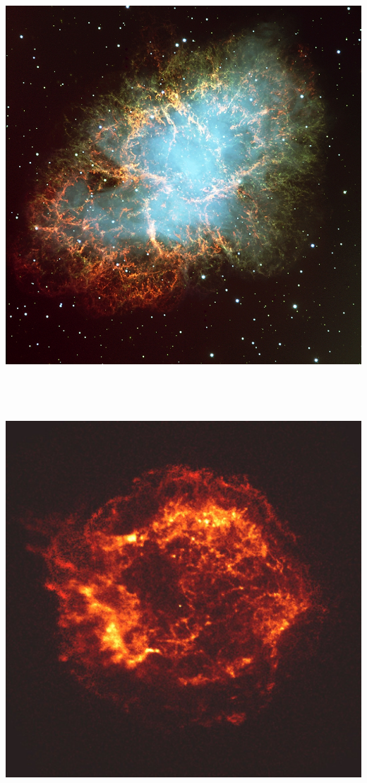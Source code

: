 \Tr
\onecolumn
\begin{center}
\includegraphics[keepaspectratio,height=15cm]{crab}
\end{center}

\Tr
\begin{center}
\includegraphics[keepaspectratio,height=15cm]{Cas_A}
\end{center}

